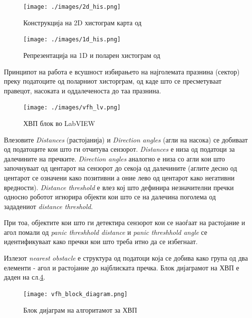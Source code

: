 \documentclass[11pt]{article}
\begin{document}
    \begin{figure}[H]
      \centering
      \texttt{[image: ./images/2d\_his.png]}
      \caption{Конструкција на 2D хистограм карта од \cite{vfh_images}}
      \label{fig:2d_his.png}
      \end{figure}

    \begin{figure}[H]
      \centering
      \texttt{[image: ./images/1d\_his.png]}
      \caption{Репрезентација на 1D и поларен хистограм од \cite{vfh_images}}
      \label{fig:1d_his.png}
      \end{figure}

    Принципот на работа е всушност избирањето на најголемата празнина (сектор) преку податоците од поларниот хисторграм, од каде што се пресметуваат правецот, насоката и оддалеченоста до таа празнина.

    \begin{figure}[H]
      \centering
      \texttt{[image: ./images/vfh\_lv.png]}
      \caption{ХВП блок во LabVIEW}
      \label{fig:vfh_lv.png}
      \end{figure}

    Влезовите \textit{Distances} (растојанија) и \textit{Direction angles} (агли на насока) се добиваат од податоците кои што ги отчитува сензорот. \textit{Distances} е низа од податоци за далечините на пречките. \textit{Direction angles} аналогно е низа со агли кои што започнуваат од центарот на сензорот до секоја од далечините (аглите десно од центарот се означени како позитивни а оние лево од центарот како негативни вредности). \textit{Distance threshold} е влез кој што дефинира незначителни пречки односно роботот игнорира објекти кои што се на далечина поголема од зададениот \textit{distance threshold}.

    При тоа, објектите кои што ги детектира сензорот кои се наоѓаат на растојание и агол помали од \textit{panic threshhold distance} и \textit{panic threshhold angle} се идентификуваат како пречки кои што треба итно да се избегнаат.

    Излезот \textit{nearest obstacle} е структура од податоци која се добива како група од два елементи - агол и растојание до најблиската пречка. Блок дијаграмот на ХВП е даден на сл.\ref{fig:vfh_block_diagram.png}.

    \begin{figure}[H]
      \texttt{[image: vfh\_block\_diagram.png]}
      \centering
      \caption{Блок дијаграм на алгоритамот за ХВП}
      \label{fig:vfh_block_diagram.png}
      \end{figure}
\end{document}
